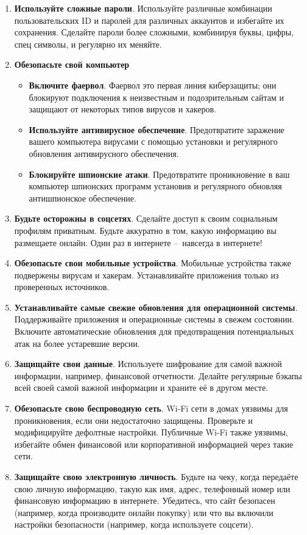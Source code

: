 \begin{enumerate}
  \item \textbf{Используйте сложные пароли}. Используйте различные комбинации пользовательских ID и паролей для различных аккаунтов и избегайте их сохранения. Сделайте пароли более сложными, комбинируя буквы, цифры, спец символы, и регулярно их меняйте.
  \item \textbf{Обезопасьте свой компьютер}
    \begin{itemize}
      \item \textbf{Включите фаервол}. Фаервол это первая линия киберзащиты; они блокируют подключения к неизвестным и подозрительным сайтам и защищают от некоторых типов вирусов и хакеров.
      \item \textbf{Используйте антивирусное обеспечение}. Предотвратите заражение вашего компьютера вирусами с помощью установки и регулярного обновления антивирусного обеспечения.
      \item \textbf{Блокируйте шпионские атаки}. Предотвратите проникновение в ваш компьютер шпионских программ установив и регулярного обновляя антишпионское обеспечение.
    \end{itemize}
  \item \textbf{Будьте осторожны в соцсетях}. Сделайте доступ к своим социальным профилям приватным. Будьте аккуратно в том, какую информацию вы размещаете онлайн. Один раз в интернете – навсегда в интернете!
  \item \textbf{Обезопасьте свои мобильные устройства}. Мобильные устройства также подвержены вирусам и хакерам. Устанавливайте приложения только из проверенных источников.
  \item \textbf{Устанавливайте самые свежие обновления для операционной системы}. Поддерживайте приложения и операционные системы в свежем состоянии. Включите автоматические обновления для предотвращения потенциальных атак на более устаревшие версии. 
  \item \textbf{Защищайте свои данные}. Используете шифрование для самой важной информации, например, финансовой отчетности. Делайте регулярные бэкапы всей своей самой важной информации и храните её в другом месте.
  \item \textbf{Обезопасьте свою беспроводную сеть}. Wi-Fi сети в домах уязвимы для проникновения, если они недостаточно защищены. Проверьте и модифицируйте дефолтные настройки. Публичные Wi-Fi также уязвимы, избегайте обмен финансовой или корпоративной информацией через такие сети.
  \item \textbf{Защищайте свою электронную личность}. Будьте на чеку, когда передаёте свою личную информацию, такую как имя, адрес, телефонный номер или финансовую информацию в интернете. Убедитесь, что сайт безопасен (например, когда производите онлайн покупку) или что вы включили настройки безопасности (например, когда используете соцсети).

\end{enumerate}
